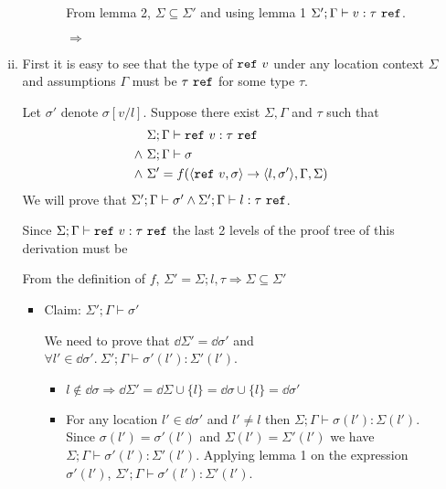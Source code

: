 \begin{enumerate}[(a)]
\begin{enumerate}[i.]
\begin{itemize}
\begin{itemize}
  From lemma 2, $\Sigma \subseteq \Sigma'$ and using lemma 1 $\Sigma' ; \Gamma \vdash v : \tau ~ \texttt{ref}$.

  $\Rightarrow$
\end{itemize} 
\end{itemize}

\item 

  First it is easy to see that the type of $\texttt{ref}~v$ under any location context $\Sigma$ and assumptions $\Gamma$ must be $\tau~\texttt{ref}$ for some type $\tau$.

  Let $\sigma'$ denote $\sigma[v/l]$. Suppose there exist $\Sigma, \Gamma$ and $\tau$ such that 
  \begin{align*}
  &\Sigma;\Gamma \vdash \texttt{ref}~v : \tau~\texttt{ref} \\
  \wedge~&\Sigma;\Gamma \vdash \sigma\\
  \wedge~&\Sigma' = f(\langle \texttt{ref}~v, \sigma \rangle \rightarrow \langle l, \sigma' \rangle, \Gamma, \Sigma)
  \end{align*}
  We will prove that $\Sigma';\Gamma \vdash \sigma' \wedge \Sigma';\Gamma \vdash l : \tau ~\texttt{ref}$.

  Since $\Sigma;\Gamma \vdash \texttt{ref}~v : \tau~\texttt{ref}$ the last 2 levels of the proof tree of this derivation must be

  From the definition of $f$, $\Sigma' = \Sigma; l, \tau \Rightarrow \Sigma \subseteq \Sigma'$

  \begin{itemize}
    \item Claim: $\Sigma';\Gamma \vdash \sigma'$

    We need to prove that $\dd \Sigma' = \dd \sigma'$ and $\forall l' \in \dd \sigma'.~\Sigma';\Gamma \vdash \sigma'(l') : \Sigma'(l')$.
    \begin{itemize}
    \item $l \notin \dd \sigma \Rightarrow \dd \Sigma' = \dd \Sigma \cup \{l\} = \dd \sigma \cup \{l\} = \dd \sigma'$
    \item For any location $l' \in \dd \sigma'$ and $l' \neq l$ then $\Sigma; \Gamma \vdash \sigma(l') : \Sigma(l')$. Since $\sigma(l') = \sigma'(l')$ and $\Sigma(l') = \Sigma'(l')$ we have $\Sigma; \Gamma \vdash \sigma'(l') : \Sigma'(l')$. Applying lemma 1 on the expression $\sigma'(l')$, $\Sigma'; \Gamma \vdash \sigma'(l') : \Sigma'(l')$.


\end{itemize}
\end{itemize}
\end{enumerate}
\end{enumerate}
